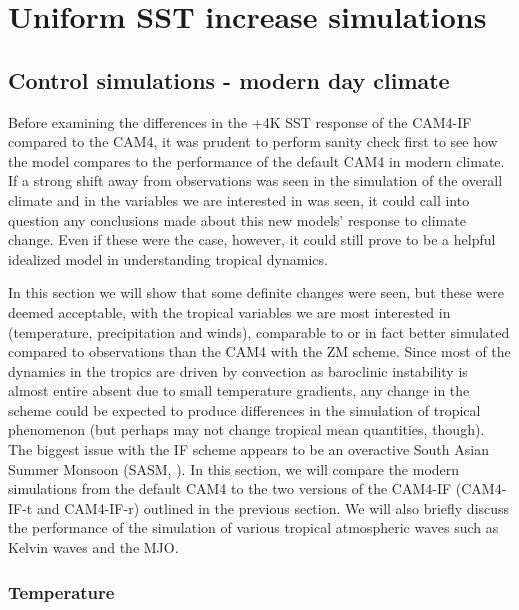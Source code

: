 \documentclass[letterpaper,12pt,titlepage,oneside,final]{book}
\begin{document}
\chapter{Uniform SST increase simulations}
\section{Control simulations - modern day climate}
Before examining the differences in the +4K SST response of the CAM4-IF compared to the CAM4, it was prudent to perform sanity check first to see how the model compares to the performance of the default CAM4 in modern climate. If a strong shift away from observations was seen in the simulation of the overall climate and in the variables we are interested in was seen, it could call into question any conclusions made about this new models' response to climate change. Even if these were the case, however, it could still prove to be a helpful idealized model in understanding tropical dynamics. 

In this section we will show that some definite changes were seen, but these were deemed acceptable, with the tropical variables we are most interested in (temperature, precipitation and winds), comparable to or in fact better simulated compared to observations than the CAM4 with the ZM scheme. Since most of the dynamics in the tropics are driven by convection as baroclinic instability is almost entire absent due to small temperature gradients, any change in the scheme could be expected to produce differences in the simulation of tropical phenomenon (but perhaps may not change tropical mean quantities, though). The biggest issue with the IF scheme appears to be an overactive South Asian Summer Monsoon (SASM, \cite{fan_future_2012}). In this section, we will compare the modern simulations from the default CAM4 to the two versions of the CAM4-IF (CAM4-IF-t and CAM4-IF-r) outlined in the previous section. We will also briefly discuss the performance of the simulation of various tropical atmospheric waves such as Kelvin waves and the MJO. 

\subsection{Temperature}
\end{document}
